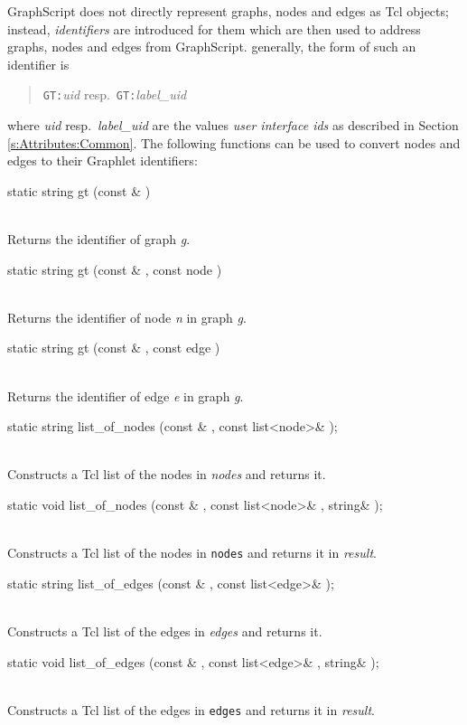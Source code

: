 \documentclass[twoside,fleqn]{report}
\begin{document}
GraphScript does not directly represent graphs, nodes and edges
as Tcl objects; instead, \emph{identifiers} are introduced for
them which are then used to address graphs, nodes and edges from
GraphScript. generally, the form of such an identifier is

\begin{quote}
  \texttt{GT:}\emph{uid} resp.\ \texttt{GT:}\emph{label\_uid}
\end{quote}

where \emph{uid} resp.\ \emph{label\_uid} are the values
\emph{user interface ids} as described in Section
\ref{s:Attributes:Common}. The following functions can be
used to convert nodes and edges to their Graphlet identifiers:

\begin{Cdefinition}
  
  \item[static string gt (const \GT{Graph}\& \Param{g})]
  \strut\\
  Returns the \GraphScript{} identifier of graph \emph{g}.
  
  \item[static string gt (const \GT{Graph}\& \Param{g}, const node \Param{n})]
  \strut\\
  Returns the \GraphScript{} identifier of node \emph{n}
  in graph \emph{g}.
  
  \item[static string gt (const \GT{Graph}\& \Param{g}, const edge \Param{e})]
  \strut\\
  Returns the \GraphScript{} identifier of edge \emph{e}
  in graph \emph{g}.

  \item[static string list\_of\_nodes (const \GT{Graph}\& \Param{g},
  const list<node>\& \Param{nodes});]
  \strut\\
  Constructs a Tcl list of the nodes in \emph{nodes} and returns it.
  
  \item[static void list\_of\_nodes (const \GT{Graph}\& \Param{g},
  const list<node>\& \Param{nodes},
  string\& \Param{result});]
  \strut\\
  Constructs a Tcl list of the nodes in \texttt{nodes} and
  returns it in \emph{result}.

  \item[static string list\_of\_edges (const \GT{Graph}\& \Param{g},
  const list<edge>\& \Param{edges});]
  \strut\\
  Constructs a Tcl list of the edges in \emph{edges} and returns it.

  \item[static void list\_of\_edges (const \GT{Graph}\& \Param{g},
  const list<edge>\& \Param{edges},
  string\& \Param{result});]
  \strut\\
  Constructs a Tcl list of the edges in \texttt{edges} and
  returns it in \emph{result}.

\end{Cdefinition}
\end{document}
